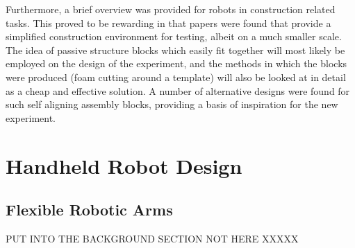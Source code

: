 \documentclass[11pt]{article}
\begin{document}
Furthermore, a brief overview was provided for robots in construction related tasks. This proved to be rewarding in that papers were found that provide a simplified construction environment for testing, albeit on a much smaller scale. The idea of passive structure blocks which easily fit together will most likely be employed on the design of the experiment, and the methods in which the blocks were produced (foam cutting around a template) will also be looked at in detail as a cheap and effective solution. A number of alternative designs were found for such self aligning assembly blocks, providing a basis of inspiration for the new experiment.


\pagebreak
\pagebreak

\section{Handheld Robot Design}
\subsection{Flexible Robotic Arms} PUT INTO THE BACKGROUND SECTION NOT HERE XXXXX
\end{document}
